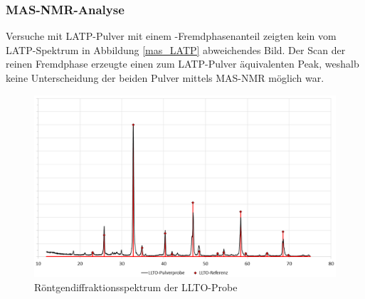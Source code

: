 \documentclass[a4paper, 11pt, headsepline,footsepline,twoside,abstract]{scrbook}
\begin{document}
\subsubsection{MAS-NMR-Analyse}
Versuche mit LATP-Pulver mit einem -Fremdphasenanteil zeigten kein vom LATP-Spektrum in Abbildung \ref{mas_LATP} abweichendes Bild. Der Scan der reinen Fremdphase erzeugte einen zum LATP-Pulver äquivalenten Peak, weshalb keine Unterscheidung der beiden Pulver mittels MAS-NMR möglich war.
\newpage
\begin{figure}[b!]
	\centering
	\includegraphics[width=1.0\columnwidth]{images/XRD_LLTO.png}
	\caption{Röntgendiffraktionsspektrum der LLTO-Probe}
	\label{xrd_LLTO}
\end{figure}
\end{document}
